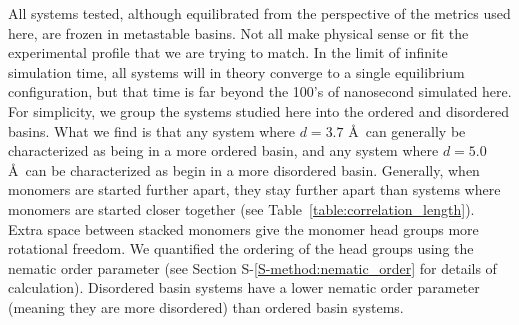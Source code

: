 \documentclass[journal=jpcbfk,manuscript=article]{achemso}
\begin{document}
  All systems tested, although equilibrated from the perspective of the metrics used here, are
  frozen in metastable basins. Not all make physical sense or fit the experimental profile that 
  we are trying to match. In the limit of infinite simulation time, all systems will in theory 
  converge to a single equilibrium configuration, but that time is far beyond the 100's of 
  nanosecond simulated here. For simplicity, we group the systems studied here into the ordered
  and disordered basins. What we find is that any system where $\mathit{d}=3.7$ \AA~can generally 
  be characterized as being in a more ordered basin, and any system where $\mathit{d}=5.0$ \AA~can
  be characterized as begin in a more disordered basin. Generally, when monomers are started further 
  apart, they stay further apart than systems where monomers are started closer together 
  (see Table~\ref{table:correlation_length}). Extra space between stacked 
  monomers give the monomer head groups more rotational freedom. We quantified the ordering of
  the head groups using the nematic order parameter (see Section S-\ref{S-method:nematic_order}
  for details of calculation). Disordered basin systems have a lower nematic order parameter 
  (meaning they are more disordered) than ordered basin systems.


  
\end{document}
